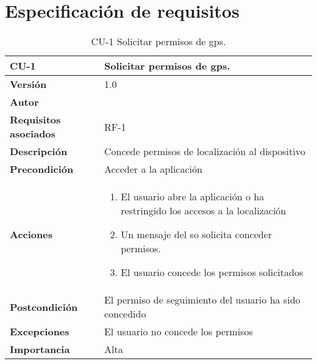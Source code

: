 \section{Especificación de requisitos}



\begin{table}[p]
	\centering
	\begin{tabularx}{\linewidth}{ p{} p{} }
		\toprule
		\textbf{CU-1}    & \textbf{Solicitar permisos de \acrshort{gps}.}\\
		\toprule
		\textbf{Versión}              & 1.0    \\
		\textbf{Autor}                & \autor \\
		\textbf{Requisitos asociados} & RF-1 \\
		\textbf{Descripción}          & Concede permisos de localización al dispositivo \\
		\textbf{Precondición}         & Acceder a la aplicación \\
		\textbf{Acciones}             &
		\begin{enumerate}
			\def\labelenumi{\arabic{enumi}.}
			\tightlist
			\item El usuario abre la aplicación o ha restringido los accesos a la localización
			\item Un mensaje del \acrfull{so} solicita conceder permisos.
			\item El usuario concede los permisos solicitados
		\end{enumerate}\\
		\textbf{Postcondición}        & El permiso de seguimiento del usuario ha sido concedido \\
		\textbf{Excepciones}          & El usuario no concede los permisos \\
		\textbf{Importancia}          & Alta  \\
		\bottomrule
	\end{tabularx}
	\caption{CU-1 Solicitar permisos de \acrshort{gps}.}
\end{table}

